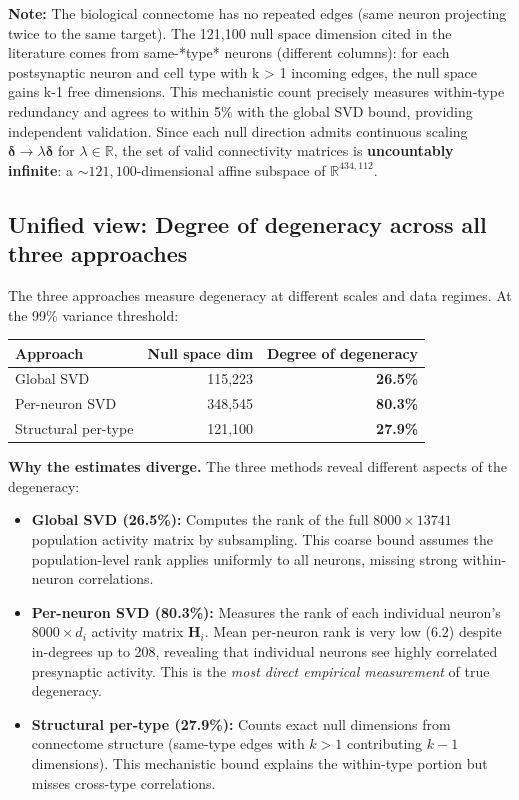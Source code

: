 \documentclass[11pt,a4paper]{article}
\begin{document}
\noindent\textbf{Note:} The biological connectome has no repeated edges (same neuron projecting twice to the same target). The 121,100 null space dimension cited in the literature comes from same-*type* neurons (different columns): for each postsynaptic neuron and cell type with k > 1 incoming edges, the null space gains k-1 free dimensions. This mechanistic count precisely measures within-type redundancy and agrees to within 5\% with the global SVD bound, providing independent validation. Since each null direction admits continuous scaling $\boldsymbol{\delta} \to \lambda \boldsymbol{\delta}$ for $\lambda \in \mathbb{R}$, the set of valid connectivity matrices is \textbf{uncountably infinite}: a ${\sim}121{,}100$-dimensional affine subspace of $\mathbb{R}^{434{,}112}$.

\subsection*{Unified view: Degree of degeneracy across all three approaches}

The three approaches measure degeneracy at different scales and data regimes. At the 99\% variance threshold:

\begin{center}
\begin{tabular}{lrr}
\toprule
Approach & Null space dim & \textbf{Degree of degeneracy} \\
\midrule
Global SVD & 115,223 & \textbf{26.5\%} \\
Per-neuron SVD & 348,545 & \textbf{80.3\%} \\
Structural per-type & 121,100 & \textbf{27.9\%} \\
\bottomrule
\end{tabular}
\end{center}

\noindent\textbf{Why the estimates diverge.} The three methods reveal different aspects of the degeneracy:

\begin{itemize}[nosep]
\item \textbf{Global SVD (26.5\%):} Computes the rank of the full $8000 \times 13741$ population activity matrix by subsampling. This coarse bound assumes the population-level rank applies uniformly to all neurons, missing strong within-neuron correlations.

\item \textbf{Per-neuron SVD (80.3\%):} Measures the rank of each individual neuron's $8000 \times d_i$ activity matrix $\mathbf{H}_i$. Mean per-neuron rank is very low ($6.2$) despite in-degrees up to 208, revealing that individual neurons see highly correlated presynaptic activity. This is the \emph{most direct empirical measurement} of true degeneracy.

\item \textbf{Structural per-type (27.9\%):} Counts exact null dimensions from connectome structure (same-type edges with $k>1$ contributing $k-1$ dimensions). This mechanistic bound explains the within-type portion but misses cross-type correlations.
\end{itemize}
\end{document}
